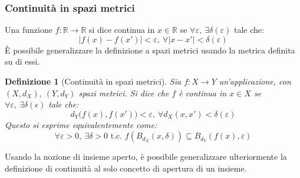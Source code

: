 \documentclass[12pt]{scrartcl}
\theoremstyle{style}
\newtheorem{definizione}{Definizione}[section]
\numberwithin{equation}{subsection}
\begin{document}
\subsubsection{Continuit\`a in spazi metrici}
Una funzione $f:\mathbb{R}\to \mathbb{R}$ si dice continua in $x \in \mathbb{R}$ se $\forall \varepsilon , \ \exists \delta (\varepsilon )$ tale che:
\[
\lvert f(x) - f(x') \rvert < \varepsilon, \ \forall \lvert x-x' \rvert < \delta (\varepsilon )
\] 
\`E possibile generalizzare la definizione a spazi metrici usando la metrica definita su di essi.
\begin{definizione}
	[Continuit\`a in spazi metrici]
Sia $f : X\to Y$ un'applicazione, con $(X,d_X) , \ (Y,d_Y)$ spazi metrici. Si dice che $f$ \`e continua in $x \in X$ se $\forall \varepsilon , \ \exists \delta (\epsilon )$ tale che:
\begin{equation}
	d_Y \big(f(x), f(x')\big) < \varepsilon , \ \forall d_X(x,x')< \delta (\varepsilon )
\end{equation}
Questo si esprime equivalentemente come:
\[
\forall \varepsilon >0, \ \exists \delta > 0 \text{ t.c. } f(B_{d_X} (x,\delta )) \subseteq B_{d_Y} (f(x),\varepsilon )
\] 

\end{definizione}
\noindent Usando la nozione di insieme aperto, \`e possibile generalizzare ulteriormente la definizione di continuit\`a al solo concetto di apertura di un insieme.
\end{document}
